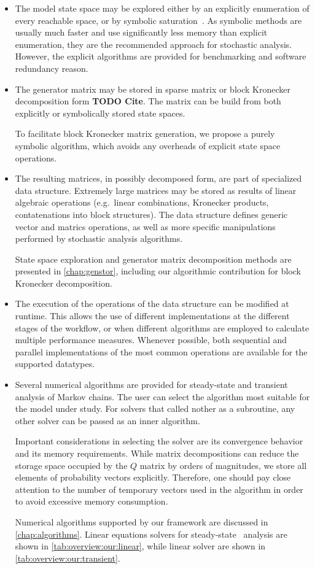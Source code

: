 \begin{itemize}
\item The model state space may be explored either by an explicitly
  enumeration of every reachable space, or by symbolic
  saturation~\citep{Ciardo:2006}. As symbolic methods are usually much
  faster and use significantly less memory than explicit enumeration,
  they are the recommended approach for stochastic analysis. However,
  the explicit algorithms are provided for benchmarking and software
  redundancy reason.
\item The generator matrix may be stored in sparse matrix or block
  Kronecker decomposition form \textbf{TODO Cite}. The matrix can be
  build from both explicitly or symbolically stored state spaces.

  To facilitate block Kronecker matrix generation, we propose a purely
  symbolic algorithm, which avoids any overheads of explicit state
  space operations.
\item The resulting matrices, in possibly decomposed form, are part of
  specialized data structure. Extremely large matrices may be stored
  as results of linear algebraic operations (e.g.~linear combinations,
  Kronecker products, contatenations into block structures). The data
  structure defines generic vector and matrics operations, as well as
  more specific manipulations performed by stochastic analysis
  algorithms.

  State space exploration and generator matrix decomposition methods
  are presented in \cref{chap:genstor}, including our algorithmic
  contribution for block Kronecker decomposition.
\item The execution of the operations of the data structure can be
  modified at runtime. This allows the use of different
  implementations at the different stages of the workflow, or when
  different algorithms are employed to calculate multiple performance
  measures. Whenever possible, both sequential and parallel
  implementations of the most common operations are available for the
  supported datatypes.
\item Several numerical algorithms are provided for steady-state and
  transient analysis of Markov chains. The user can select the
  algorithm most suitable for the model under study. For solvers that
  called nother as a subroutine, any other solver can be passed as an
  inner algorithm.

  Important considerations in selecting the solver are its convergence
  behavior and its memory requirements. While matrix decompositions
  can reduce the storage space occupied by the $Q$ matrix by orders of
  magnitudes, we store all elements of probability vectors
  explicitly. Therefore, one should pay close attention to the number
  of temporary vectors used in the algorithm in order to avoid
  excessive memory consumption.

  Numerical algorithms supported by our framework are discussed in
  \cref{chap:algorithms}. Linear equations solvers for steady-state
  \CTMC\ analysis are shown in \cref{tab:overview:our:linear}, while
  linear solver are shown in \cref{tab:overview:our:transient}.
\end{itemize}

